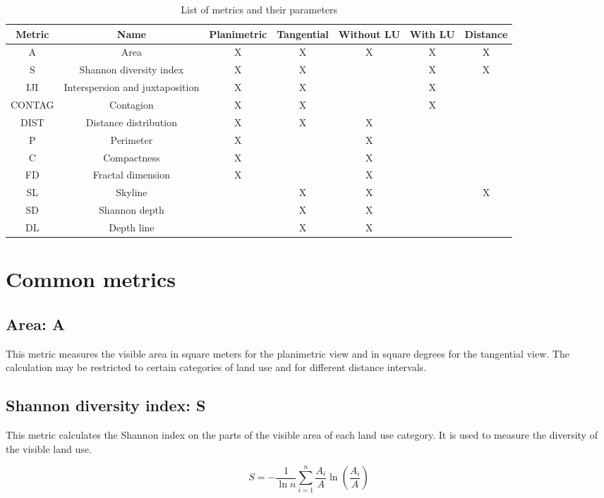 \documentclass{report}
\begin{document}
\begin{table}[H]
	\begin{tabular}{|c|c|c|c|c|c|c|}
		\hline
		Metric & Name & Planimetric & Tangential & Without LU & With LU & Distance\\
		\hline
		A & Area & X & X & X & X & X\\
		\hline
		S & Shannon diversity index & X & X &  & X & X\\
		\hline
		IJI & Interspersion and juxtaposition & X & X &  & X & \\
		\hline
		CONTAG & Contagion & X & X &  & X & \\
		\hline
		DIST & Distance distribution & X & X & X &  & \\
		\hline
		P & Perimeter & X &  & X &  & \\
		\hline
		C & Compactness & X &  & X &  & \\
		\hline
		FD & Fractal dimension & X &  & X &  & \\
		\hline
		SL & Skyline &  & X & X &  & X \\
		\hline
		SD & Shannon depth &  & X & X &  & \\
		\hline
		DL & Depth line &  & X & X &  & \\		
		\hline
	\end{tabular}
	\caption{List of metrics and their parameters}
	\label{metrics_tab}
\end{table}

\section{Common metrics}

\subsection{Area: A}
This metric measures the visible area in square meters for the planimetric view and in square degrees for the tangential view. The calculation may be restricted to certain categories of land use and for different distance intervals.

\subsection{Shannon diversity index: S}
This metric calculates the Shannon index on the parts of the visible area of each land use category. It is used to measure the diversity of the visible land use.

$$S = -\frac{1}{\ln n}\sum_{i=1}^{n}\frac{A_i}{A}\ln\left(\frac{A_i}{A}\right)$$
\end{document}
